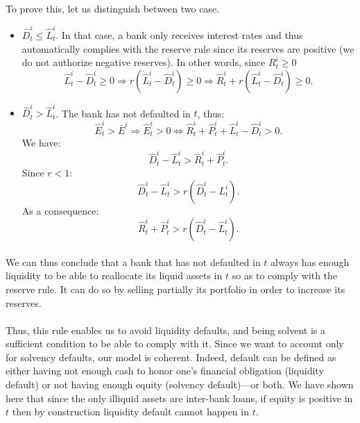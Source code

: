 \documentclass{article}
\newcommand{\wh}{\widehat}
\begin{document}
\paragraph{}
To prove this, let us distinguish between two case.
\begin{itemize}
    \item $\widehat D^i_t \leq \widehat L^i_t$. In that case, a bank only receives interest rates and thus automatically complies with the reserve rule since its reserves are positive (we do not authorize negative reserves). In other words, since $R_t^i \geq 0$
    $$ \widehat L_t^i - \widehat D_t^i \geq 0 \Rightarrow r(\widehat L_t^i - \widehat D_t^i) \geq 0 \Rightarrow \widehat R_t^i + r(\widehat L_t^i - \widehat D_t^i) \geq 0.$$
    \item $\widehat D^i_t > \widehat L^i_t$. The bank has not defaulted in $t$, thus:
    $$\widehat E^i_t > \bar{E}^i \Rightarrow \widehat E^i_t > 0 \Leftrightarrow \widehat{R}^i_t + \widehat{P}^i_t + \widehat L^i_t - \widehat D^i_t > 0.$$
    We have:
    $$\widehat D^i_t - \widehat L^i_t > \widehat{R}^i_t + \widehat{P}^i_t.$$
    Since $ r < 1$:
    $$ \widehat{D}^i_t - \widehat L^i_t > r(\widehat D^i_t - L^i_t).$$
    As a consequence: 
    $$ \widehat{R}^i_t + \widehat{P}^i_t > r(\wh D^i_t - \wh L^i_t).$$
\end{itemize}

\paragraph{}
We can thus conclude that a bank that has not defaulted in $t$ always has enough liquidity to be able to reallocate its liquid assets in $t$ so as to comply with the reserve rule. It can do so by selling partially its portfolio in order to increase its reserves.

\paragraph{}
Thus, this rule enables us to avoid liquidity defaults, and being solvent is a sufficient condition to be able to comply with it. Since we want to account only for solvency defaults, our model is coherent. Indeed, default can be defined as either having not enough cash to honor one's financial obligation (liquidity default) or not having enough equity (solvency default)---or both. We have shown here that since the only illiquid assets are inter-bank loans, if equity is positive in $t$ then by construction liquidity default cannot happen in $t$. 
\end{document}
